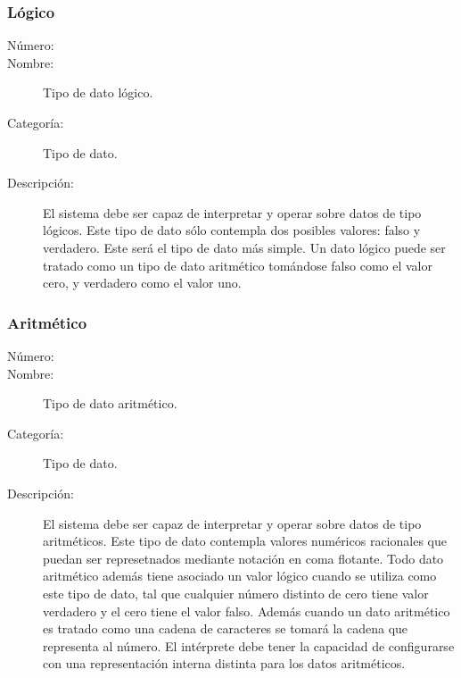 \subsubsection{Lógico}
\begin{framed}
	\begin{description}
		\item [Número:] \cn
		\item [Nombre:] Tipo de dato lógico.
		\item [Categoría:] Tipo de dato.
		\item [Descripción:] El sistema debe ser capaz de interpretar y operar sobre datos de tipo lógicos. Este tipo
		de dato sólo contempla dos posibles valores: falso y verdadero. Este será el tipo de dato más simple. Un dato lógico
		puede ser tratado como un tipo de dato aritmético tomándose falso como el valor cero, y verdadero como el valor uno.
	\end {description}
\end{framed}
\subsubsection{Aritmético}
\begin{framed}
	\begin{description}
		\item [Número:] \cn
		\item [Nombre:] Tipo de dato aritmético.
		\item [Categoría:] Tipo de dato.
		\item [Descripción:] El sistema debe ser capaz de interpretar y operar sobre datos de tipo aritméticos. Este tipo
		de dato contempla valores numéricos racionales que puedan ser represetnados mediante notación en coma flotante. Todo dato aritmético además tiene asociado un valor lógico cuando se utiliza como este
		tipo de dato, tal que cualquier número distinto de cero tiene valor verdadero y el cero tiene el valor falso. Además cuando un dato aritmético
		es tratado como una cadena de caracteres se tomará la cadena que representa al número. El intérprete debe tener la capacidad de configurarse con una representación interna distinta para los datos aritméticos.
	\end {description}
\end{framed}


